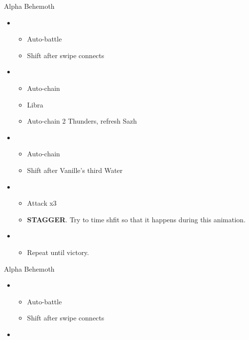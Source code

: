 \begin{paracol}{2}
	

	\begin{battle}{Alpha Behemoth}
		\begin{itemize}
			\item \first
			      \begin{itemize}
				      \item Auto-battle
				      \item Shift after swipe connects
			      \end{itemize}
			\item \third
			      \begin{itemize}
				      \item Auto-chain
				      \item Libra
				      \item Auto-chain 2 Thunders, refresh Sazh
			      \end{itemize}
			\item \fourth
			      \begin{itemize}
				      \item Auto-chain
				      \item Shift after Vanille's third Water
			      \end{itemize}
			\item \first
			      \begin{itemize}
				      \item Attack x3
				      \item \textbf{STAGGER}. Try to time shfit so that it happens during this animation.
			      \end{itemize}
			\item \fifth
			      \begin{itemize}
				      \item Repeat until victory.
			      \end{itemize}
		\end{itemize}
	\end{battle}
	\switchcolumn
\begin{battle}{Alpha Behemoth}
\begin{itemize}
    \item \first
    \begin{itemize}
        \item Auto-battle
        \item Shift after swipe connects
    \end{itemize}
    \item \third

\end{itemize}
\end{battle}
\end{paracol}
